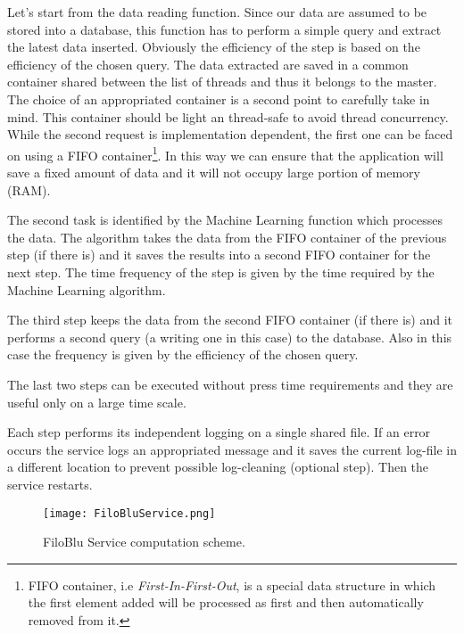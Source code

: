 \documentclass{standalone}
\begin{document}
Let's start from the data reading function.
Since our data are assumed to be stored into a database, this function has to perform a simple query and extract the latest data inserted.
Obviously the efficiency of the step is based on the efficiency of the chosen query.
The data extracted are saved in a common container shared between the list of threads and thus it belongs to the master.
The choice of an appropriated container is a second point to carefully take in mind.
This container should be light an thread-safe to avoid thread concurrency.
While the second request is implementation dependent, the first one can be faced on using a \textsf{FIFO} container\footnote{
  FIFO container, i.e \emph{First-In-First-Out}, is a special data structure in which the first element added will be processed as first and then automatically removed from it.
}.
In this way we can ensure that the application will save a fixed amount of data and it will not occupy large portion of memory (RAM).

The second task is identified by the Machine Learning function which processes the data.
The algorithm takes the data from the FIFO container of the previous step (if there is) and it saves the results into a second FIFO container for the next step.
The time frequency of the step is given by the time required by the Machine Learning algorithm.

The third step keeps the data from the second FIFO container (if there is) and it performs a second query (a writing one in this case) to the database.
Also in this case the frequency is given by the efficiency of the chosen query.

The last two steps can be executed without press time requirements and they are useful only on a large time scale.

Each step performs its independent logging on a single shared file.
If an error occurs the service logs an appropriated message and it saves the current log-file in a different location to prevent possible log-cleaning (optional step).
Then the service restarts.

\begin{figure}[htbp]
\centering
\texttt{[image: FiloBluService.png]}
\caption{FiloBlu Service computation scheme.
}
\label{fig:FiloBlu}
\end{figure}
\end{document}
